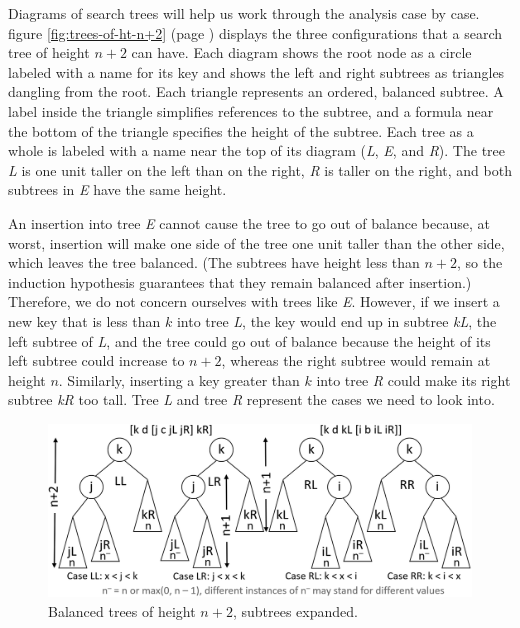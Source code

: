 Diagrams of search trees will help us work through the analysis case by case.
figure \ref{fig:trees-of-ht-n+2} (page \pageref{fig:trees-of-ht-n+2})
displays the three configurations that a search tree of height $n+2$ can have.
Each diagram shows the root node as a circle labeled with a name for its key
and shows the left and right subtrees as triangles dangling from the root.
Each triangle represents an ordered, balanced subtree.
A label inside the triangle
simplifies references to the subtree,
and a formula near the bottom of the triangle
specifies the height of the subtree.
Each tree as a whole is labeled with a name near the top of its diagram
(\emph{L}, \emph{E}, and \emph{R}).
The tree \emph{L} is one unit taller on the left than on the right,
\emph{R} is taller on the right, and
both subtrees in \emph{E} have the same height.

An insertion into tree \emph{E} cannot cause the tree to go out of balance
because, at worst, insertion will make one side of the tree
one unit taller than the other side, which leaves the tree
balanced. (The subtrees have height less than $n+2$,
so the induction hypothesis guarantees that they remain
balanced after insertion.)
Therefore, we do not concern ourselves with trees like \emph{E}.
However, if we insert a new key that is less than $k$
into tree \emph{L}, the key would end up in subtree \emph{kL},
the left subtree of \emph{L}, and
the tree could go out of balance
because the height of its left subtree could increase to $n+2$,
whereas the right subtree would remain at height $n$.
Similarly, inserting a key greater than $k$ into tree \emph{R}
could make its right subtree \emph{kR} too tall.
Tree \emph{L} and tree \emph{R} represent the cases we need to look into.

\begin{figure}
\begin{center}
\includegraphics[scale=1]{images-cmyk/ht2-or-more-ex}
\end{center}
\caption{Balanced trees of height $n+2$, subtrees expanded.}
\label{fig:trees-of-ht-n+2-expanded}
\end{figure}

